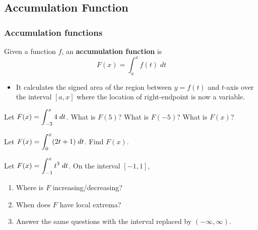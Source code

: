 \documentclass[10pt,t,handout,ignorenonframetext,aspectratio=169]{beamer}
\title[\course]{\lecTitle}
\institute[Ohio State]
{
  \medskip
}
\date[\week]{\semester}
\author{Tae Eun Kim, Ph.D.}
\begin{document}
\begin{frame}
  \titlepage
\end{frame}


\subsection{Accumulation Function}
\begin{frame}
  \frametitle{Accumulation functions}
  \begin{defn}
    Given a function $f$, an \textbf{accumulation function} is
    \[
      F(x) = \int_a^x f(t) \; dt
    \]
  \end{defn}

  \begin{itemize}
  \item It calculates the signed area of the region between $y = f(t)$ and $t$-axis over the interval $[a, x]$ where the location of right-endpoint is now a variable.
  \end{itemize}
\end{frame}

\begin{frame}
  \vs
  \begin{example}[Rectangles]
    Let $\displaystyle F(x) = \int_{-3}^x 4 \; dt$. What is $F(5)$? What is
    $F(-5)$? What is $F(x)$?
  \end{example}
\end{frame}

\begin{frame}
  \vs
  \begin{example}[Trapezoid]
    Let $\displaystyle F(x) = \int_0^x (2t+1) \; dt$. Find $F(x)$.
  \end{example}
\end{frame}

\begin{frame}
  \vs
  \begin{example}
    Let $\displaystyle F(x) = \int_{-1}^x t^3 \; dt$. On the interval $[-1, 1]$,

    \begin{enumerate}
    \item Where is $F$ increasing/decreasing?
    \item When does $F$ have local
      extrema?
    \item Answer the same questions with the interval replaced by
      $(-\infty, \infty)$.
    \end{enumerate}
  \end{example}
\end{frame}
\end{document}
